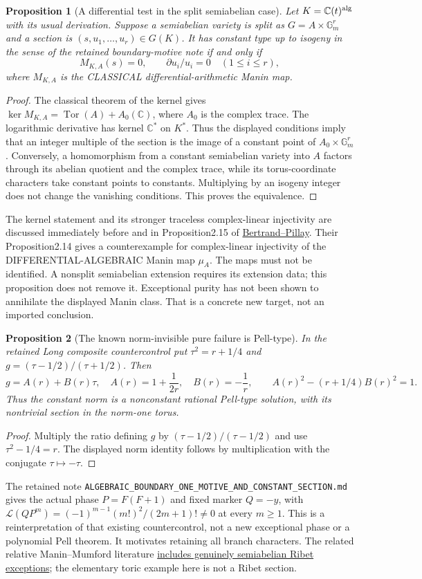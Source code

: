 \documentclass[11pt]{article}
\newtheorem{proposition}{Proposition}
\begin{document}
\begin{proposition}[A differential test in the split semiabelian case]
Let $K=\mathbb C(t)^{\rm alg}$ with its usual derivation. Suppose a
semiabelian variety is split as $G=A\times\mathbb G_m^r$ and a section
is $(s,u_1,\ldots,u_r)\in G(K)$. It has constant type up to isogeny in
the sense of the retained boundary-motive note if and only if
\[
 M_{K,A}(s)=0,\qquad \partial u_i/u_i=0\quad(1\leq i\leq r),
\]
where $M_{K,A}$ is the CLASSICAL differential-arithmetic Manin map.
\end{proposition}
\begin{proof}
The classical theorem of the kernel gives
$\ker M_{K,A}=\operatorname{Tor}(A)+A_0(\mathbb C)$, where $A_0$ is
the complex trace. The logarithmic derivative has kernel
$\mathbb C^*$ on $K^*$. Thus the displayed conditions imply that an
integer multiple of the section is the image of a constant point of
$A_0\times\mathbb G_m^r$. Conversely, a homomorphism from a constant
semiabelian variety into $A$ factors through its abelian quotient and
the complex trace, while its torus-coordinate characters take constant
points to constants. Multiplying by an isogeny integer does not change
the vanishing conditions. This proves the equivalence.
\end{proof}
The kernel statement and its stronger traceless complex-linear
injectivity are discussed immediately before and in Proposition2.15 of
\href{https://arxiv.org/abs/1502.02012}{Bertrand--Pillay}.
Their Proposition2.14 gives a counterexample for complex-linear
injectivity of the DIFFERENTIAL-ALGEBRAIC Manin map $\mu_A$.
The maps must not be identified. A nonsplit semiabelian extension
requires its extension data; this proposition does not remove it.
Exceptional purity has not been shown to annihilate the displayed
Manin class. That is a concrete new target, not an imported conclusion.

\begin{proposition}[The known norm-invisible pure failure is Pell-type]
In the retained Long composite countercontrol put
$\tau^2=r+1/4$ and $g=(\tau-1/2)/(\tau+1/2)$. Then
\[
 g=A(r)+B(r)\tau,\quad A(r)=1+\frac1{2r},\quad B(r)=-\frac1r,
 \qquad A(r)^2-(r+1/4)B(r)^2=1.
\]
Thus the constant norm is a nonconstant rational Pell-type solution,
with its nontrivial section in the norm-one torus.
\end{proposition}
\begin{proof}
Multiply the ratio defining $g$ by $(\tau-1/2)/(\tau-1/2)$ and use
$\tau^2-1/4=r$. The displayed norm identity follows by multiplication
with the conjugate $\tau\mapsto-\tau$.
\end{proof}
The retained note
\texttt{ALGEBRAIC\_BOUNDARY\_ONE\_MOTIVE\_AND\_CONSTANT\_SECTION.md}
gives the actual phase $P=F(F+1)$ and fixed marker $Q=-y$, with
$\mathcal L(QP^m)=(-1)^{m-1}(m!)^2/(2m+1)!\ne0$ at every $m\geq1$.
This is a reinterpretation of that existing countercontrol, not a new
exceptional phase or a polynomial Pell theorem. It motivates retaining
all branch characters. The related relative Manin--Mumford literature
\href{https://arxiv.org/abs/1307.1008}{includes genuinely semiabelian
Ribet exceptions}; the elementary toric example here is not a Ribet section.
\end{document}
